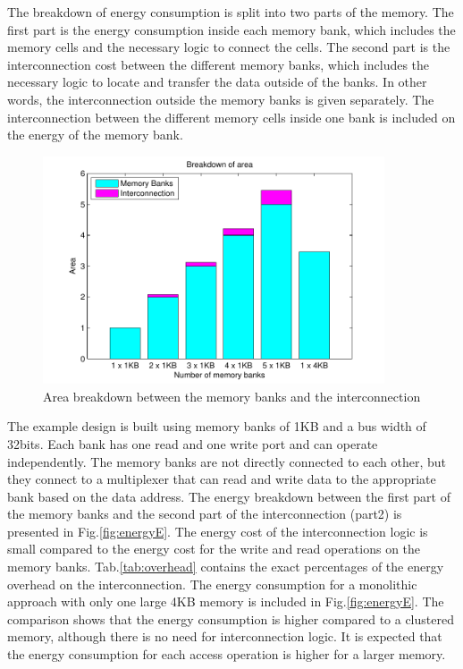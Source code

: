 The breakdown of energy consumption is split into two parts of the memory.
The first part is the energy consumption inside each memory bank, which includes the memory cells and the necessary logic to connect the cells.
The second part is the interconnection cost between the different memory banks, which includes the necessary logic to locate and transfer the data outside of the banks. 
In other words, the interconnection outside the memory banks is given separately. 
The interconnection between the different memory cells inside one bank is included on the energy of the memory bank.

 \begin{figure}
 \centering
 \includegraphics[width = 0.9\textwidth]{E/area.pdf}
  \caption{Area breakdown between the memory banks and the interconnection}
 \label{fig:areaE}
 \end{figure}

The example design is built using memory banks of 1KB and a bus width of 32bits.
Each bank has one read and one write port and can operate independently.
The memory banks are not directly connected to each other, but they connect to a multiplexer that can read and write data to the appropriate bank based on the data address. 
The energy breakdown between the first part of the memory banks and the second part of the interconnection (part2) is presented in Fig.\ref{fig:energyE}.
The energy cost of the interconnection logic is small compared to the energy cost for the write and read operations on the memory banks.
Tab.\ref{tab:overhead} contains the exact percentages of the energy overhead on the interconnection. 
The energy consumption for a monolithic approach with only one large 4KB memory is included in Fig.\ref{fig:energyE}.
The comparison shows that the energy consumption is higher compared to a clustered memory, although there is no need for interconnection logic.
It is expected that the energy consumption for each access operation is higher for a larger memory.
 
